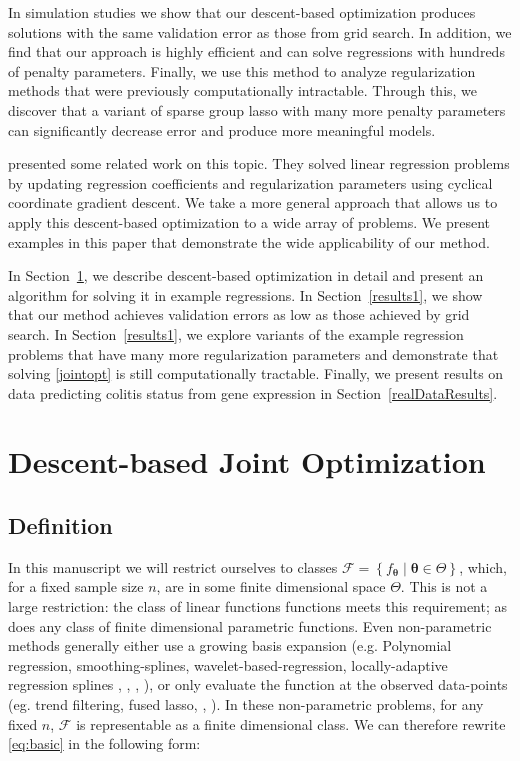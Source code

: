 \documentclass[12pt,letterpaper]{article}
\begin{document}
In simulation studies we show that our descent-based optimization produces solutions with the same validation error as those from grid search. In addition, we find that our approach is highly efficient and can solve regressions with hundreds of penalty parameters. Finally, we use this method to analyze regularization methods that were previously computationally intractable. Through this, we discover that a variant of sparse group lasso with many more penalty parameters can significantly decrease error and produce more meaningful models.

\citet{lorbert2010descent} presented some related work on this topic. They solved linear regression problems by updating regression coefficients and regularization parameters using cyclical coordinate gradient descent. We take a more general approach that allows us to apply this descent-based optimization to a wide array of problems. We present examples in this paper that demonstrate the wide applicability of our method.

In Section~\ref{defineDescJointOpt}, we describe descent-based optimization in detail and present an algorithm for solving it in example regressions. In Section~\ref{results1}, we show that our method achieves validation errors as low as those achieved by grid search. In Section~\ref{results1}, we explore variants of the example regression problems that have many more regularization parameters and demonstrate that solving \eqref{jointopt} is still computationally tractable. Finally, we present results on data predicting colitis status from gene expression in Section~\ref{realDataResults}.

\section{Descent-based Joint Optimization}\label{defineDescJointOpt}
\subsection{Definition}
In this manuscript we will restrict ourselves to classes $\mathcal{F} = \left\{f_{\boldsymbol \theta}\middle| \boldsymbol \theta\in\Theta\right\}$, which, for a fixed sample size $n$, are in some finite dimensional space $\Theta$. This is not a large restriction: the class of linear functions functions meets this requirement; as does any class of finite dimensional parametric functions. Even non-parametric methods generally either use a growing basis expansion (e.g. Polynomial regression, smoothing-splines, wavelet-based-regression, locally-adaptive regression splines \citep{tsybakov2008introduction}, \citep{wahba1981spline}, \citep{donoho1994ideal}, \citep{mammen1997locally}), or only evaluate the function at the observed data-points (eg. trend filtering, fused lasso, \citep{kim2009ell_1}, \citep{tibshirani2005sparsity}). In these non-parametric problems, for any fixed $n$, $\mathcal{F}$ is representable as a finite dimensional class.
We can therefore rewrite \eqref{eq:basic} in the following form:
\end{document}
